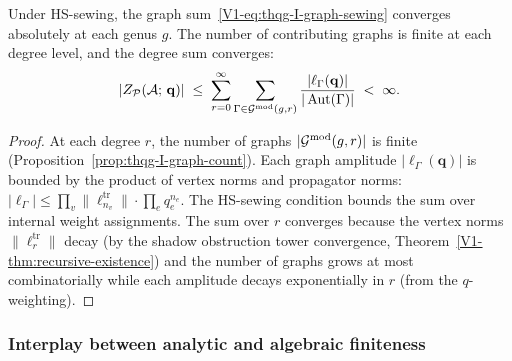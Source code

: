 \begin{proposition}
Under HS-sewing, the graph sum~\eqref{V1-eq:thqg-I-graph-sewing} converges absolutely at each genus $g$. The number of contributing graphs is finite at each degree level, and the degree sum converges:
\begin{equation}%
|Z_{\mathcal{P}}(\cA;\,\mathbf{q})| \;\leq\; \sum_{r=0}^{\infty} \sum_{\Gamma \in \Gmod(g,r)} \frac{|\ell_\Gamma(\mathbf{q})|}{|\Aut(\Gamma)|} \;<\; \infty.
\end{equation}
\end{proposition}

\begin{proof}
At each degree $r$, the number of graphs $|\mathcal{G}^{\mathrm{mod}}(g,r)|$ is finite (Proposition~\ref{prop:thqg-I-graph-count}). Each graph amplitude $|\ell_\Gamma(\mathbf{q})|$ is bounded by the product of vertex norms and propagator norms: $|\ell_\Gamma| \leq \prod_{v} \|\ell_{n_v}^{\mathrm{tr}}\| \cdot \prod_{e} q_e^{n_e}$. The HS-sewing condition bounds the sum over internal weight assignments. The sum over $r$ converges because the vertex norms $\|\ell_r^{\mathrm{tr}}\|$ decay (by the shadow obstruction tower convergence, Theorem~\ref{V1-thm:recursive-existence}) and the number of graphs grows at most combinatorially while each amplitude decays exponentially in $r$ (from the $q$-weighting).
\end{proof}

\subsubsection{Interplay between analytic and algebraic finiteness}

